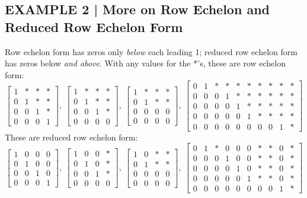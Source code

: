 \documentclass{article}
\theoremstyle{mystyle}
\begin{document}
\subsection*{EXAMPLE 2 | More on Row Echelon and Reduced Row Echelon Form}
Row echelon form has zeros only \emph{below} each leading 1; reduced row echelon form has zeros below \emph{and above}. With any values for the $*$'s, these are row echelon form:
\[
\begin{bmatrix}1&*&*&*\\0&1&*&*\\0&0&1&*\\0&0&0&1\end{bmatrix},\
\begin{bmatrix}1&*&*&*\\0&1&*&*\\0&0&1&*\\0&0&0&0\end{bmatrix},\
\begin{bmatrix}1&*&*&*\\0&1&*&*\\0&0&0&0\\0&0&0&0\end{bmatrix},\
\begin{bmatrix}0&1&*&*&*&*&*&*&*&*\\0&0&0&1&*&*&*&*&*&*\\0&0&0&0&1&*&*&*&*&*\\0&0&0&0&0&1&*&*&*&*\\0&0&0&0&0&0&0&0&1&*\end{bmatrix}
\]
These are reduced row echelon form:
\[
\begin{bmatrix}1&0&0&0\\0&1&0&0\\0&0&1&0\\0&0&0&1\end{bmatrix},\
\begin{bmatrix}1&0&0&*\\0&1&0&*\\0&0&1&*\\0&0&0&0\end{bmatrix},\
\begin{bmatrix}1&0&*&*\\0&1&*&*\\0&0&0&0\\0&0&0&0\end{bmatrix},\
\begin{bmatrix}0&1&*&0&0&0&*&*&0&*\\0&0&0&1&0&0&*&*&0&*\\0&0&0&0&1&0&*&*&0&*\\0&0&0&0&0&1&*&*&0&*\\0&0&0&0&0&0&0&0&1&*\end{bmatrix}
\]
\end{document}
